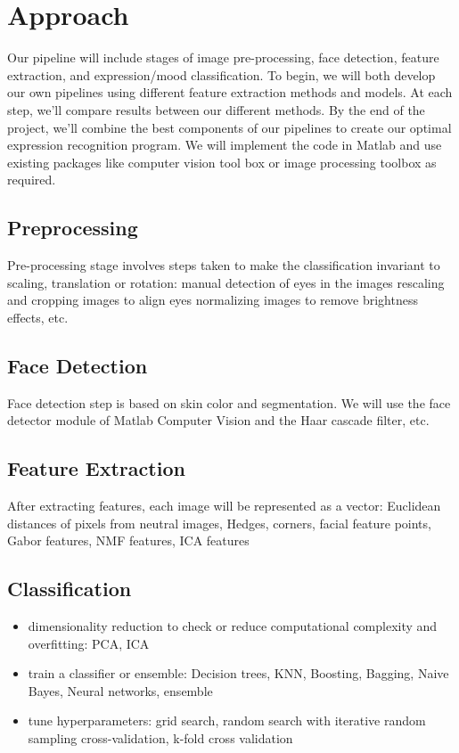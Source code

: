 \documentclass[10pt,letterpaper]{article}
\begin{document}
\section{Approach}
Our pipeline will include stages of image pre-processing, face detection, feature extraction, and expression/mood classification. To begin, we will both develop our own pipelines using different feature extraction methods and models. At each step, we'll compare results between our different methods. By the end of the project, we'll combine the best components of our pipelines to create our optimal expression recognition program. We will implement the code in Matlab and use existing packages like computer vision tool box or image processing toolbox as required.

\subsection{Preprocessing}
Pre-processing stage involves steps taken to make the classification invariant to scaling, translation or rotation:
\subitem manual detection of eyes in the images 
\subitem rescaling and cropping images to align eyes
\subitem normalizing images to remove brightness effects, etc.

\subsection{Face Detection}
Face detection step is based on skin color and segmentation. We will use the face detector module of Matlab Computer Vision and the Haar cascade filter, etc.

\subsection{Feature Extraction}
After extracting features, each image will be represented as a vector:
\subitem Euclidean distances of pixels from neutral images, Hedges, corners, facial feature points, Gabor features, NMF features, ICA features

\subsection{Classification}
\begin{itemize}
\item dimensionality reduction to check or reduce computational complexity and overfitting:
\subitem PCA, ICA
\item train a classifier or ensemble: 
\subitem Decision trees, KNN, Boosting, Bagging, Naive Bayes, Neural networks, ensemble 
\item tune hyperparameters:
\subitem grid search, random search with iterative random sampling cross-validation, k-fold cross validation
\end{itemize}
\end{document}
